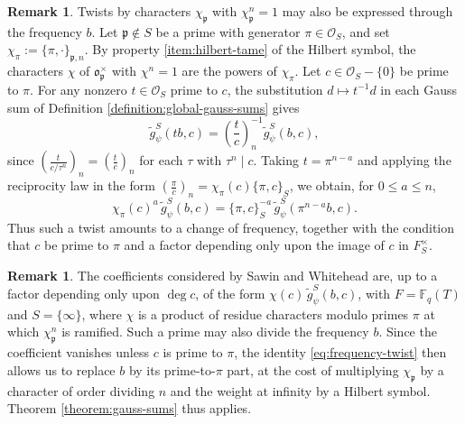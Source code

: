 \documentclass[reqno]{amsart}
\newcommand{\qr}[2]{\left( \frac{#1}{#2} \right)}
\theoremstyle{plain}
\theoremstyle{definition}
\newtheorem{remark}[theorem]{Remark}
\theoremstyle{itplain}
\numberwithin{equation}{section}
\numberwithin{theorem}{section}
\begin{document}
\begin{remark}\label{remark:frequency-twist}
  Twists by characters $\chi_{\mathfrak{p}}$ with $\chi_{\mathfrak{p}}^n = 1$ may also be expressed through the frequency $b$.  Let $\mathfrak{p} \notin S$ be a prime with generator $\pi \in \mathcal{O}_S$, and set $\chi_\pi := \{\pi, \cdot\}_{\mathfrak{p}, n}$.  By property \eqref{item:hilbert-tame} of the Hilbert symbol, the characters $\chi$ of $\mathfrak{o}_{\mathfrak{p}}^\times$ with $\chi^n = 1$ are the powers of $\chi_\pi$.  Let $c \in \mathcal{O}_S - \{0\}$ be prime to $\pi$.  For any nonzero $t \in \mathcal{O}_S$ prime to $c$, the substitution $d \mapsto t^{-1} d$ in each Gauss sum of Definition \ref{definition:global-gauss-sums} gives
  \begin{equation}\label{eq:frequency-twist}
    \tilde{g}_\psi^S(t b, c) = \qr{t}{c}_n^{-1} \tilde{g}_\psi^S(b, c),
  \end{equation}
  since $\qr{t}{c / \tau^n}_n = \qr{t}{c}_n$ for each $\tau$ with $\tau^n \mid c$.  Taking $t = \pi^{n-a}$ and applying the reciprocity law in the form $\qr{\pi}{c}_n = \chi_\pi(c) \{\pi, c\}_S$, we obtain, for $0 \leq a \leq n$,
  \begin{equation*}
    \chi_\pi(c)^a \, \tilde{g}_\psi^S(b, c) = \{\pi, c\}_S^{-a} \, \tilde{g}_\psi^S(\pi^{n-a} b, c).
  \end{equation*}
  Thus such a twist amounts to a change of frequency, together with the condition that $c$ be prime to $\pi$ and a factor depending only upon the image of $c$ in $F_S^\times$.
\end{remark}

\begin{remark}\label{remark:sawin-whitehead}
  The coefficients considered by Sawin and Whitehead \cite[Proposition~2.6]{2025arXiv2507.08662} are, up to a factor depending only upon $\deg c$, of the form $\chi(c) \, \tilde{g}_\psi^S(b, c)$, with $F = \mathbb{F}_q(T)$ and $S = \{\infty\}$, where $\chi$ is a product of residue characters modulo primes $\pi$ at which $\chi_{\mathfrak{p}}^n$ is ramified.  Such a prime may also divide the frequency $b$.  Since the coefficient vanishes unless $c$ is prime to $\pi$, the identity \eqref{eq:frequency-twist} then allows us to replace $b$ by its prime-to-$\pi$ part, at the cost of multiplying $\chi_{\mathfrak{p}}$ by a character of order dividing $n$ and the weight at infinity by a Hilbert symbol.  Theorem \ref{theorem:gauss-sums} thus applies.
\end{remark}
\end{document}
